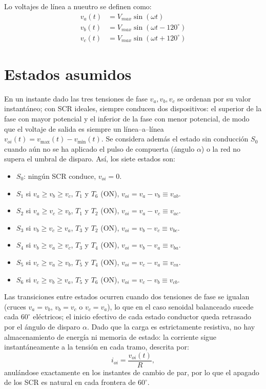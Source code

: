 \documentclass[conference]{IEEEtran}
\begin{document}
Lo voltajes de línea a nueutro se definen como:
\begin{equation*}
	\begin{aligned}
		v_a(t) &= V_{max}\sin(\omega t) \\
		v_b(t) &= V_{max}\sin(\omega t - 120^\circ) \\
		v_c(t) &= V_{max}\sin(\omega t + 120^\circ)
	\end{aligned}
\end{equation*}

\section{Estados asumidos}

	En un instante dado las tres tensiones de fase $v_a,v_b,v_c$ se ordenan por su valor instantáneo; con SCR ideales, siempre conducen dos dispositivos: el superior de la fase con mayor potencial y el inferior de la fase con menor potencial, de modo que el voltaje de salida es siempre un línea–a–línea $v_{oi}(t)=v_{\max}(t)-v_{\min}(t)$. Se considera además el estado sin conducción $S_0$ cuando aún no se ha aplicado el pulso de compuerta (ángulo $\alpha$) o la red no supera el umbral de disparo. Así, los siete estados son: 
	
	\begin{itemize}
		\item $S_0$: ningún SCR conduce, $v_{oi}=0$.
		\item $S_1$ si $v_a\ge v_b\ge v_c$, $T_1$ y $T_6$ (ON), $v_{oi}=v_a-v_b\equiv v_{ab}$.
		\item $S_2$ si $v_a\ge v_c\ge v_b$, $T_1$ y $T_2$ (ON), $v_{oi}=v_a-v_c\equiv v_{ac}$.
		\item $S_3$ si $v_b\ge v_c\ge v_a$, $T_3$ y $T_2$ (ON), $v_{oi}=v_b-v_c\equiv v_{bc}$.
		\item $S_4$ si $v_b\ge v_a\ge v_c$, $T_3$ y $T_4$ (ON), $v_{oi}=v_b-v_a\equiv v_{ba}$.
		\item $S_5$ si $v_c\ge v_a\ge v_b$, $T_5$ y $T_4$ (ON), $v_{oi}=v_c-v_a\equiv v_{ca}$.
		\item $S_6$ si $v_c\ge v_b\ge v_a$, $T_5$ y $T_6$ (ON), $v_{oi}=v_c-v_b\equiv v_{cb}$. 
	\end{itemize}

	Las transiciones entre estados ocurren cuando dos tensiones de fase se igualan (cruces $v_a=v_b$, $v_b=v_c$ o $v_c=v_a$), lo que en el caso senoidal balanceado sucede cada $60^\circ$ eléctricos; el inicio efectivo de cada estado conductor queda retrasado por el ángulo de disparo $\alpha$. Dado que la carga es estrictamente resistiva, no hay almacenamiento de energía ni memoria de estado: la corriente sigue instantáneamente a la tensión en cada tramo, descrita por:
		\begin{equation*}
			i_{oi}=\frac{v_{oi}(t)}{R},
		\end{equation*}
	anulándose exactamente en los instantes de cambio de par, por lo que el apagado de los SCR es natural en cada frontera de \(60^\circ\).
\end{document}
